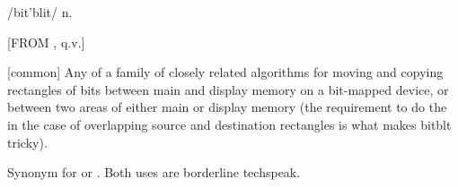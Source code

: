  /bit'blit/ n.

[FROM , q.v.]
\begin{inparaenum}
\item {[}common] Any of a family of closely related algorithms for moving
    and copying rectangles of bits between main and display memory on a
    bit-mapped device, or between two areas of either main or display memory
    (the requirement to do the  in the case of
    overlapping source and destination rectangles is what makes
    bitblt tricky).
\item Synonym for  or . Both uses are
    borderline techspeak.
\end{inparaenum}

